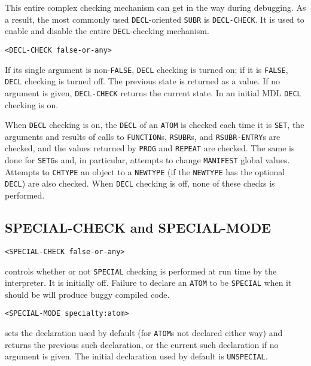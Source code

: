 \documentclass[a4paper]{scrbook}
\begin{document}
This entire complex checking mechanism can get in the way during debugging. As a result, the most commonly used
\texttt{DECL}-oriented \texttt{SUBR} is \texttt{DECL-CHECK}. It is used to enable and
disable the entire \texttt{DECL}-checking mechanism.

\begin{verbatim}
<DECL-CHECK false-or-any>
\end{verbatim}

If its single argument is non-\texttt{FALSE}, \texttt{DECL} checking is turned on; if it is \texttt{FALSE}, \texttt{DECL}
checking is turned off. The previous state is returned as a value. If no argument is given, \texttt{DECL-CHECK} returns the
current state. In an initial MDL \texttt{DECL} checking is on.

When \texttt{DECL} checking is on, the \texttt{DECL} of an \texttt{ATOM} is checked each time it is \texttt{SET}, the
arguments and results of calls to \texttt{FUNCTION}s, \texttt{RSUBR}s, and \texttt{RSUBR-ENTRY}s are checked, and the
values returned by \texttt{PROG} and \texttt{REPEAT} are checked. The same is done for \texttt{SETG}s and, in particular,
attempts to change \texttt{MANIFEST} global values. Attempts to \texttt{CHTYPE} an object to a \texttt{NEWTYPE} (if the
\texttt{NEWTYPE} has the optional \texttt{DECL}) are also checked. When \texttt{DECL} checking is off, none of these checks
is performed.

\subsection{SPECIAL-CHECK and SPECIAL-MODE}\label{special-check-and-special-mode}

\begin{verbatim}
<SPECIAL-CHECK false-or-any>
\end{verbatim}

 controls whether or not \texttt{SPECIAL} checking is performed at run time by the
interpreter. It is initially off. Failure to declare an \texttt{ATOM} to be \texttt{SPECIAL} when it should be will produce
buggy compiled code.

\begin{verbatim}
<SPECIAL-MODE specialty:atom>
\end{verbatim}

 sets the declaration used by default (for \texttt{ATOM}s not declared either way) and
returns the previous such declaration, or the current such declaration if no argument is given. The initial declaration
used by default is \texttt{UNSPECIAL}.
\end{document}
